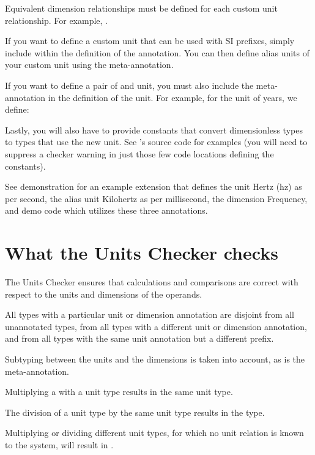 Equivalent dimension relationships must be defined for each custom unit
relationship. For example, .

If you want to define a custom unit that can be used with SI prefixes, simply
include  within the definition of the
annotation. You can then define alias units of your custom unit using the
 meta-annotation.

If you want to define a pair of  and  unit,
you must also include the  meta-annotation in the definition
of the  unit. For example, for the unit of years, we define:

Lastly, you will also have to provide constants that convert dimensionless types
to types that use the new unit. See 's source code for examples
(you will need to suppress a checker warning in just those few code locations
defining the constants).

See demonstration  for an example extension
that defines the unit Hertz (hz) as per second, the alias unit Kilohertz as per
millisecond, the dimension Frequency, and demo code which utilizes these three
annotations.

\section{What the Units Checker checks\label{units-checks}}

The Units Checker ensures that calculations and comparisons are correct with
respect to the units and dimensions of the operands.

All types with a particular unit or dimension annotation are disjoint from all
unannotated types, from all types with a different unit or dimension annotation,
and from all types with the same unit annotation but a different prefix.

Subtyping between the units and the dimensions is taken into account, as is the
 meta-annotation.

Multiplying a  with a unit type results in the same unit
type.

The division of a unit type by the same unit type results in the
 type.

Multiplying or dividing different unit types, for which no unit relation is
known to the system, will result in .

